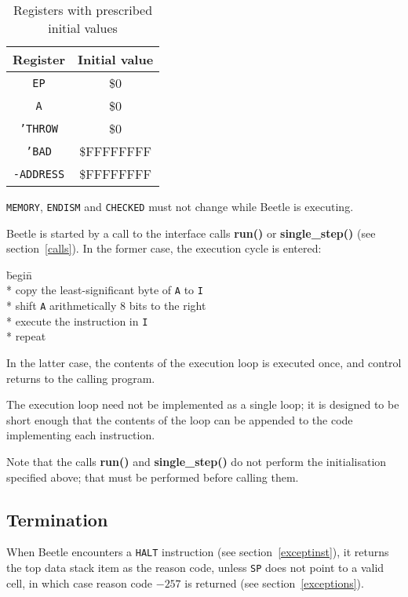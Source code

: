 \documentclass{article}
\begin{document}
\begin{table}[htbp]
\begin{center}
\begin{tabular}{cc} \toprule
\bf Register & \bf Initial value \\ \midrule
{\tt EP} & \$0 \\
{\tt A} & \$0 \\
{\tt 'THROW} & \$0 \\
{\tt 'BAD} & {\$FFFFFFFF} \\
{\tt -ADDRESS} & {\$FFFFFFFF} \\ \bottomrule
\end{tabular}
\caption{\label{inittable}Registers with prescribed initial values}
\end{center}
\end{table}

{\tt MEMORY}, {\tt ENDISM} and {\tt CHECKED} must not change while Beetle is executing.

Beetle is started by a call to the interface calls {\bf run()} or {\bf
single\_step()} (see section~\ref{calls}). In the former case, the execution
cycle is entered:

\begin{tabbing}
\hspace{0.5in}\=begin\=\+\+ \\*
copy the least-significant byte of {\tt A} to {\tt I} \\*
shift {\tt A} arithmetically 8 bits to the right \\*
execute the instruction in {\tt I} \- \\*
repeat
\end{tabbing}

In the latter case, the contents of the execution loop is executed once, and
control returns to the calling program.

The execution loop need not be implemented as a single loop; it  is designed to
be short enough that the contents of the loop can be appended  to the code
implementing each instruction.

Note that the calls {\bf run()} and {\bf single\_step()} do not perform the
initialisation specified above; that must be performed before calling them.


\subsection{Termination}

When Beetle encounters a {\tt HALT} instruction (see section~\ref{exceptinst}),
it returns the top data stack item as the reason code, unless {\tt SP} does not
point to a valid cell, in which case reason code $-257$ is returned (see section~\ref{exceptions}).
\end{document}
